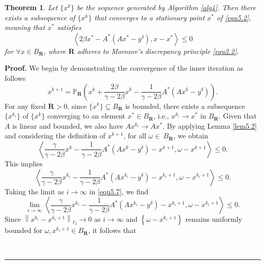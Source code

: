 \documentclass[a4paper,12pt]{article}
\newtheorem{theorem}{Theorem}[section]
\numberwithin{equation}{section}
\newenvironment{proof}[1][Proof]{\textbf{#1.} }
{\ \rule{0.75em}{0.75em}\smallskip}
\begin{document}
\begin{theorem}\label{the5.8}
    Let $\{x^{k}\}$ be the sequence generated by Algorithm \ref{alg4}. Then there exists a subsequence of $\{x^{k}\}$ that converges to a stationary point $x^{*}$ of \eqref{equ5.2}, meaning that $x^{*}$ satisfies
    \begin{equation*}
        \left<2\beta x^{*}-A^{*}\left(Ax^{*}-y^{\delta}\right), x-x^{*}\right>\leq 0
    \end{equation*}
    for $\forall x\in B_{\mathbf{R}}$, where $\mathbf{R}$ adheres to Morozov's discrepancy principle \eqref{equ2.2}.
\end{theorem}

\begin{proof}
    We begin by demonstrating the convergence of the inner iteration as follows
    \begin{equation*}
        x^{k+1}=\mathbb{P}_{\mathbf{R}}\left(x^{k}+\frac{2\beta}{\gamma-2\beta}x^{k} -\frac{1}{\gamma-2\beta}A^{*}\left(Ax^{k}-y^{\delta}\right)\right).
    \end{equation*}
    For any fixed $\mathbf{R}>0$, since $\{x^{k}\}\subseteq B_{\mathbf{R}}$ is bounded, there exists a subsequence $\{x^{k_{i}}\}$ of $\{x^{k}\}$ converging to an element $x^{*}\in B_{\mathbf{R}}$, i.e., $x^{k_{i}}\rightarrow x^{*}$ in $B_{\mathbf{R}}$. Given that $A$ is linear and bounded, we also have $Ax^{k_{i}}\rightarrow Ax^{*}$. By applying Lemma \ref{lem5.2} and considering the definition of $x^{k+1}$, for all $\omega\in\ B_{\mathbf{R}}$, we obtain
    \begin{equation*}
        \left<\frac{\gamma}{\gamma-2\beta}x^{k}-\frac{1}{\gamma-2\beta}A^{*}\left(Ax^{k}- y^{\delta}\right)-x^{k+1},\omega-x^{k+1}\right>\leq 0.
    \end{equation*}
    This implies
    \begin{equation}\label{equ5.7}
        \left<\frac{\gamma}{\gamma-2\beta}x^{k_{i}}-\frac{1}{\gamma-2\beta}A^{*}\left(Ax^{k_{i}} -y^{\delta}\right) -x^{k_{i}+1},\omega-x^{k_{i}+1}\right>\leq 0.
    \end{equation}
    Taking the limit as $i\rightarrow\infty$ in \eqref{equ5.7}, we find
    \begin{equation*}
        \lim_{i\rightarrow\infty}\left<\frac{\gamma}{\gamma-2\beta}x^{k_{i}}- \frac{1}{\gamma-2\beta}A^{*}\left(Ax^{k_{i}} -y^{\delta}\right) -x^{k_{i}+1},\omega-x^{k_{i}+1}\right>\leq 0.
    \end{equation*}
    Since $\left\|x^{k_{i}}-x^{k_{i}+1}\right\|_{\ell_{2}}\rightarrow 0$ as $i\rightarrow\infty$ and $\left\{\omega-x^{k_{i}+1}\right\}$ remains uniformly bounded for $\omega,x^{k_{i}+1}\in B_{\mathbf{R}}$, it follows that

\end{proof}
\end{document}
